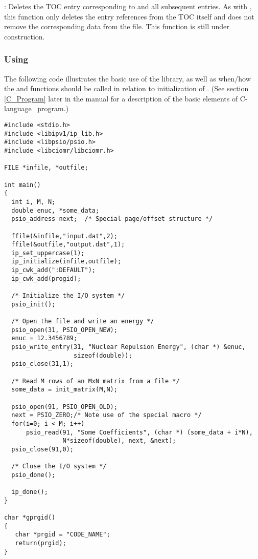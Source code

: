 : Deletes the TOC entry
corresponding to  and all subsequent entries. As with
, this function only deletes the entry
references from the TOC itself and does not remove the corresponding
data from the file. This function is still under construction.

\subsubsection{Using }
The following code illustrates the basic use of the library, as well
as when/how the  and 
functions should be called in relation to initialization of
.  (See section \ref{C_Program} later in the manual
for a description of the basic elements of C-language \PSIthree\
program.)
\begin{verbatim}
#include <stdio.h>
#include <libipv1/ip_lib.h>
#include <libpsio/psio.h>
#include <libciomr/libciomr.h>

FILE *infile, *outfile;

int main()
{
  int i, M, N;
  double enuc, *some_data;
  psio_address next;  /* Special page/offset structure */

  ffile(&infile,"input.dat",2);
  ffile(&outfile,"output.dat",1);
  ip_set_uppercase(1);
  ip_initialize(infile,outfile);
  ip_cwk_add(":DEFAULT");
  ip_cwk_add(progid);

  /* Initialize the I/O system */
  psio_init();

  /* Open the file and write an energy */
  psio_open(31, PSIO_OPEN_NEW);
  enuc = 12.3456789;
  psio_write_entry(31, "Nuclear Repulsion Energy", (char *) &enuc,
                   sizeof(double));
  psio_close(31,1);

  /* Read M rows of an MxN matrix from a file */
  some_data = init_matrix(M,N);

  psio_open(91, PSIO_OPEN_OLD);
  next = PSIO_ZERO;/* Note use of the special macro */
  for(i=0; i < M; i++)
      psio_read(91, "Some Coefficients", (char *) (some_data + i*N),
                N*sizeof(double), next, &next);
  psio_close(91,0);

  /* Close the I/O system */
  psio_done();

  ip_done();
}

char *gprgid()
{
   char *prgid = "CODE_NAME";
   return(prgid);
}
\end{verbatim}

